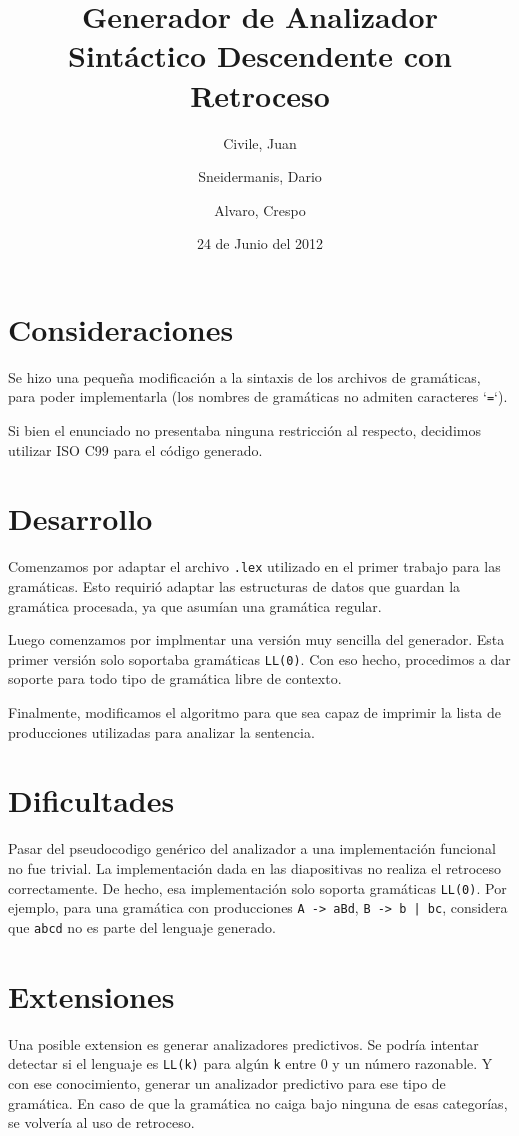 \documentclass[11pt,a4paper,titlepage]{article}
\title{Generador de Analizador Sintáctico Descendente con Retroceso}
\author{Civile, Juan \and Sneidermanis, Dario \and Alvaro, Crespo}
\date{24 de Junio del 2012}
\begin{document}
\newcommand{\awesome}[1]{\texttt{\large #1}}

\maketitle
\tableofcontents
\clearpage

\section{Consideraciones}
Se hizo una pequeña modificación a la sintaxis de los archivos de gramáticas, para poder implementarla (los nombres de gramáticas no admiten caracteres `\texttt{=}`).

Si bien el enunciado no presentaba ninguna restricción al respecto, decidimos utilizar ISO C99 para el código generado.

\section{Desarrollo}
Comenzamos por adaptar el archivo \texttt{.lex} utilizado en el primer trabajo para las gramáticas.
Esto requirió adaptar las estructuras de datos que guardan la gramática procesada, ya que asumían una gramática regular.

Luego comenzamos por implmentar una versión muy sencilla del generador.
Esta primer versión solo soportaba gramáticas \texttt{LL(0)}.
Con eso hecho, procedimos a dar soporte para todo tipo de gramática libre de contexto.

Finalmente, modificamos el algoritmo para que sea capaz de imprimir la lista de producciones utilizadas para analizar la sentencia.

\section{Dificultades}
Pasar del pseudocodigo genérico del analizador a una implementación funcional no fue trivial.
La implementación dada en las diapositivas no realiza el retroceso correctamente.
De hecho, esa implementación solo soporta gramáticas \texttt{LL(0)}.
Por ejemplo, para una gramática con producciones \texttt{A -> aBd}, \texttt{B -> b | bc}, considera que \texttt{abcd} no es parte del lenguaje generado.


\section{Extensiones}
Una posible extension es generar analizadores predictivos.
Se podría intentar detectar si el lenguaje es \texttt{LL(k)} para algún \texttt{k} entre 0 y un número razonable.
Y con ese conocimiento, generar un analizador predictivo para ese tipo de gramática.
En caso de que la gramática no caiga bajo ninguna de esas categorías, se volvería al uso de retroceso.
\end{document}

